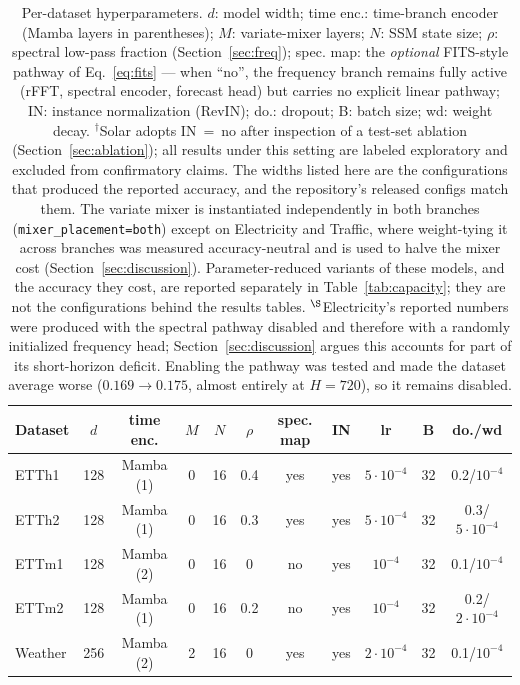 \documentclass[review,12pt]{elsarticle}
\begin{document}
\begin{table}[tb]
\centering
\caption{Per-dataset hyperparameters. $d$: model width; time enc.:
time-branch encoder (Mamba layers in parentheses); $M$: variate-mixer
layers; $N$: SSM state size; $\rho$: spectral low-pass fraction
(Section~\ref{sec:freq}); spec. map: the \emph{optional} FITS-style pathway of Eq.~\eqref{eq:fits}
--- when ``no'', the frequency branch remains fully active (rFFT, spectral
encoder, forecast head) but carries no explicit linear pathway; IN:
instance normalization (RevIN); do.: dropout; B: batch size; wd: weight
decay. $^{\dagger}$Solar adopts IN~=~no after inspection of a test-set
ablation (Section~\ref{sec:ablation}); all results under this setting are
labeled exploratory and excluded from confirmatory claims. The widths listed
here are the configurations that produced the reported accuracy, and the
repository's released configs match them. The variate mixer is instantiated
independently in both branches (\texttt{mixer\_placement=both}) except on
Electricity and Traffic, where weight-tying it across branches was measured
accuracy-neutral and is used to halve the mixer cost
(Section~\ref{sec:discussion}). Parameter-reduced variants of these models,
and the accuracy they cost, are reported separately in
Table~\ref{tab:capacity}; they are not the configurations behind the results
tables. $^{\S}$Electricity's reported numbers were produced with the spectral
pathway disabled and therefore with a randomly initialized frequency head;
Section~\ref{sec:discussion} argues this accounts for part of its short-horizon
deficit. Enabling the pathway was tested and made the dataset average worse
($0.169\rightarrow0.175$, almost entirely at $H{=}720$), so it remains
disabled.}
\label{tab:hparams}
\scriptsize
\setlength{\tabcolsep}{3.2pt}
\begin{tabular}{@{}lcccccccccc@{}}
\toprule
Dataset & $d$ & time enc. & $M$ & $N$ & $\rho$ & spec. map & IN & lr & B & do./wd \\
\midrule
ETTh1 & 128 & Mamba (1) & 0 & 16 & 0.4 & yes & yes & $5{\cdot}10^{-4}$ & 32 & 0.2/$10^{-4}$ \\
ETTh2 & 128 & Mamba (1) & 0 & 16 & 0.3 & yes & yes & $5{\cdot}10^{-4}$ & 32 & 0.3/$5{\cdot}10^{-4}$ \\
ETTm1 & 128 & Mamba (2) & 0 & 16 & 0 & no & yes & $10^{-4}$ & 32 & 0.1/$10^{-4}$ \\
ETTm2 & 128 & Mamba (1) & 0 & 16 & 0.2 & no & yes & $10^{-4}$ & 32 & 0.2/$2{\cdot}10^{-4}$ \\
Weather & 256 & Mamba (2) & 2 & 16 & 0 & yes & yes & $2{\cdot}10^{-4}$ & 32 & 0.1/$10^{-4}$ \\

\end{tabular}
\end{table}
\end{document}
